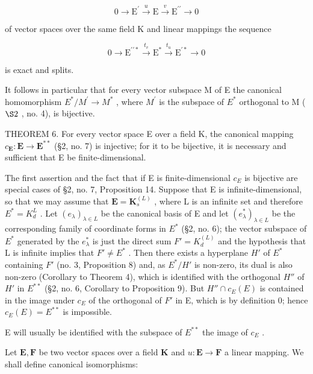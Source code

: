 \[
0 \longrightarrow \mathrm{E} ^ {\prime} \stackrel {u} {\longrightarrow} \mathrm{E} \stackrel {v} {\longrightarrow} \mathrm{E} ^ {\prime \prime} \longrightarrow 0
\]

of vector spaces over the same field K and linear mappings the sequence

\[
0 \longrightarrow \mathrm{E} ^ {\prime \prime *} \stackrel {t _ {v}} {\longrightarrow} \mathrm{E} ^ {*} \stackrel {t _ {u}} {\longrightarrow} \mathrm{E} ^ {\prime *} \longrightarrow 0
\]

is exact and splits.

It follows in particular that for every vector subspace M of E the canonical homomorphism \(E^{*}/M^{\prime} \rightarrow M^{*}\) , where \(M^{\prime}\) is the subspace of \(E^{*}\) orthogonal to M ( \(\S 2\) , no. 4), is bijective.

THEOREM 6. For every vector space E over a field K, the canonical mapping \(c_{\mathbf{E}}: \mathbf{E} \to \mathbf{E}^{**}\) (§2, no. 7) is injective; for it to be bijective, it is necessary and sufficient that E be finite-dimensional.

The first assertion and the fact that if E is finite-dimensional \(c_{E}\) is bijective are special cases of §2, no. 7, Proposition 14. Suppose that E is infinite-dimensional, so that we may assume that \(\mathbf{E} = \mathbf{K}_{s}^{(L)}\) , where L is an infinite set and therefore \(E^{*} = K_{d}^{L}\) . Let \((e_{\lambda})_{\lambda \in L}\) be the canonical basis of E and let \((e_{\lambda}^{*})_{\lambda \in L}\) be the corresponding family of coordinate forms in \(E^{*}\) (§2, no. 6); the vector subspace of \(E^{*}\) generated by the \(e_{\lambda}^{*}\) is just the direct sum \(F' = K_{d}^{(L)}\) and the hypothesis that L is infinite implies that \(F' \neq E^{*}\) . Then there exists a hyperplane \(H'\) of \(E^{*}\) containing \(F'\) (no. 3, Proposition 8) and, as \(E^{*}/H'\) is non-zero, its dual is also non-zero (Corollary to Theorem 4), which is identified with the orthogonal \(H''\) of \(H'\) in \(E^{**}\) (§2, no. 6, Corollary to Proposition 9). But \(H'' \cap c_{E}(E)\) is contained in the image under \(c_{E}\) of the orthogonal of \(F'\) in E, which is by definition 0; hence \(c_{E}(E) = E^{**}\) is impossible.

E will usually be identified with the subspace of \(E^{**}\) the image of \(c_{E}\) .

Let \(\mathbf{E}, \mathbf{F}\) be two vector spaces over a field \(\mathbf{K}\) and \(u: \mathbf{E} \to \mathbf{F}\) a linear mapping. We shall define canonical isomorphisms:

